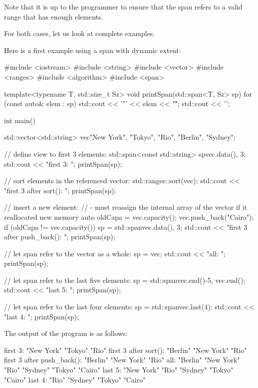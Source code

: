 Note that it is up to the programmer to ensure that the span refers to a valid range that has enough elements.

For both cases, let us look at complete examples.


Here is a first example using a span with dynamic extent:


\begin{cpp}
#include <iostream>
#include <string>
#include <vector>
#include <ranges>
#include <algorithm>
#include <span>

template<typename T, std::size_t Sz>
void printSpan(std::span<T, Sz> sp)
{
	for (const auto& elem : sp) {
		std::cout << '"' << elem << "\" ";
	}
	std::cout << '\n';
}

int main()
{
	std::vector<std::string> vec{"New York", "Tokyo", "Rio", "Berlin", "Sydney"};
	
	// define view to first 3 elements:
	std::span<const std::string> sp{vec.data(), 3};
	std::cout << "first 3: ";
	printSpan(sp);
	
	// sort elements in the referenced vector:
	std::ranges::sort(vec);
	std::cout << "first 3 after sort(): ";
	printSpan(sp);
	
	// insert a new element:
	// - must reassign the internal array of the vector if it reallocated new memory
	auto oldCapa = vec.capacity();
	vec.push_back("Cairo");
	if (oldCapa != vec.capacity()) {
		sp = std::span{vec.data(), 3};
	}
	std::cout << "first 3 after push_back(): ";
	printSpan(sp);

	// let span refer to the vector as a whole:
	sp = vec;
	std::cout << "all: ";
	printSpan(sp);

	// let span refer to the last five elements:
	sp = std::span{vec.end()-5, vec.end()};
	std::cout << "last 5: ";
	printSpan(sp);
	
	// let span refer to the last four elements:
	sp = std::span{vec}.last(4);
	std::cout << "last 4: ";
	printSpan(sp);
}
\end{cpp}

The output of the program is as follows:

\begin{shell}
first 3:              "New York" "Tokyo" "Rio"
first 3 after sort(): "Berlin" "New York" "Rio"
first 3 after push_back(): "Berlin" "New York" "Rio"
all:   "Berlin" "New York" "Rio" "Sydney" "Tokyo" "Cairo"
last 5: "New York" "Rio" "Sydney" "Tokyo" "Cairo"
last 4: "Rio" "Sydney" "Tokyo" "Cairo"
\end{shell}

